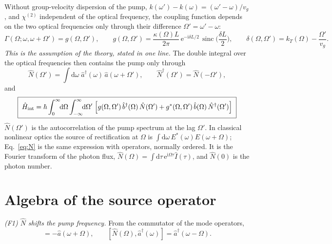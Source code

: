 \documentclass[aps,pra,onecolumn,notitlepage,11pt,amsmath,amssymb,nofootinbib]{revtex4-2}
\newcommand{\Nop}{\hat N}
\newcommand{\Iop}{\hat I}
\newcommand{\dd}{\mathrm{d}}
\newcommand{\ee}{\mathrm{e}}
\newcommand{\ii}{\mathrm{i}}
\newcommand{\sinc}{\operatorname{sinc}}
\begin{document}
Without group-velocity dispersion of the pump,
$k(\omega')-k(\omega)=(\omega'-\omega)/v_g$, and $\chi^{(2)}$ independent of the
optical frequency, the coupling function depends on the two optical
frequencies only through their difference $\Omega'=\omega'-\omega$:
\begin{equation}
\Gamma(\Omega;\omega,\omega+\Omega')=g(\Omega,\Omega'),\qquad
g(\Omega,\Omega')=\frac{\kappa(\Omega)L}{2\pi}\,\ee^{-\ii\delta L/2}\,\sinc\!\Big(\frac{\delta L}{2}\Big),
\qquad\delta(\Omega,\Omega')=k_T(\Omega)-\frac{\Omega'}{v_g}.
\label{eq:g}
\end{equation}
\emph{This is the assumption of the theory, stated in one line.} The double
integral over the optical frequencies then contains the pump only through
\begin{equation}
\Nop(\Omega')=\int\!\dd\omega\;\hat a^\dagger(\omega)\,\hat a(\omega+\Omega'),\qquad
\Nop^\dagger(\Omega')=\Nop(-\Omega'),
\label{eq:N}
\end{equation}
and
\begin{equation}
\boxed{\;\hat H_{\rm int}=\hbar\int_0^\infty\!\!\dd\Omega\int_{-\infty}^{\infty}\!\!\dd\Omega'\;
\Big[g(\Omega,\Omega')\,\hat b^\dagger(\Omega)\,\Nop(\Omega')+g^*(\Omega,\Omega')\,\hat b(\Omega)\,\Nop^\dagger(\Omega')\Big]\;}
\label{eq:Hint}
\end{equation}
$\Nop(\Omega')$ is the autocorrelation of the pump spectrum at the lag
$\Omega'$. In classical nonlinear optics the source of rectification at
$\Omega$ is $\int\dd\omega\,E^*(\omega)E(\omega+\Omega)$; Eq.~\eqref{eq:N} is the
same expression with operators, normally ordered. It is the Fourier transform
of the photon flux, $\Nop(\Omega)=\int\dd\tau\,\ee^{\ii\Omega\tau}\Iop(\tau)$,
and $\Nop(0)$ is the photon number.

\section{Algebra of the source operator}
\label{sec:alg}

\emph{(F1) $\Nop$ shifts the pump frequency.} From the commutator of the mode
operators,
\begin{equation}
[\Nop(\Omega),\hat a(\omega)]=-\hat a(\omega+\Omega),\qquad
[\Nop(\Omega),\hat a^\dagger(\omega)]=\hat a^\dagger(\omega-\Omega).
\label{eq:F1}
\end{equation}
\end{document}
